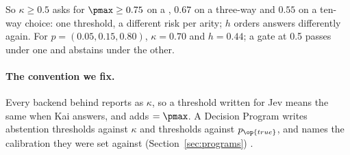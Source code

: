 So $\kappa \ge 0.5$ asks for $\pmax \ge 0.75$ on a , $0.67$ on a
three-way and $0.55$ on a ten-way choice: one threshold, a different risk per
arity; $h$ orders answers differently again. For $p = (0.05, 0.15, 0.80)$, $\kappa = 0.70$ and
$h = 0.44$; a gate at 0.5 passes under one and abstains under the other.

\paragraph{The convention we fix.}
Every backend behind  reports  as $\kappa$,
so a threshold written for Jev means the same when Kai answers, and adds
 $= \pmax$. A Decision Program writes abstention
thresholds against $\kappa$ and  thresholds against $p_{\op{true}}$,
and names the calibration they were set against (Section~\ref{sec:programs})
\shipped.
